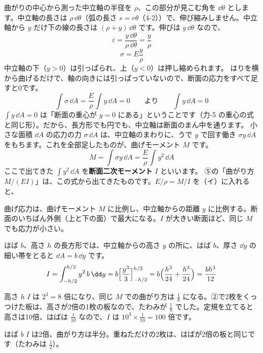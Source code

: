 曲がりの中心から測った中立軸の半径を $\rho$、この部分が見こむ角を $\dd\theta$ とします。中立軸の長さは $\rho\,\dd\theta$（弧の長さ $s=r\theta$（4-2））で、伸び縮みしません。中立軸から $y$ だけ下の線の長さは $(\rho+y)\,\dd\theta$ です。伸びは $y\,\dd\theta$ なので、
\[ \varepsilon=\frac{y\,\dd\theta}{\rho\,\dd\theta}=\frac{y}{\rho} \]
\[ \sigma=E\frac{y}{\rho} \]
中立軸の下（$y>0$）は引っぱられ、上（$y<0$）は押し縮められます。
はりを横から曲げるだけで、軸の向きには引っぱっていないので、断面の応力をすべて足すと0です。
\[ \int\sigma\,\dd A=\frac{E}{\rho}\int y\,\dd A=0\qquad\text{より}\qquad \int y\,\dd A=0 \]
$\displaystyle\int y\,\dd A=0$ は「断面の重心が $y=0$ にある」ということです（力-5 の重心の式と同じ形）。だから、長方形でも円でも、中立軸は断面のまん中を通ります。
小さな面積 $\dd A$ の応力の力 $\sigma\,\dd A$ は、中立軸のまわりに、うで $y$ で回す働き $\sigma y\,\dd A$ をもちます。これを全部足したものが、曲げモーメント $M$ です。
\[ M=\int\sigma y\,\dd A=\frac{E}{\rho}\int y^2\,\dd A \]
ここで出てきた $\displaystyle\int y^2\,\dd A$ を\textbf{断面二次モーメント} $I$ といいます。
⑤の「曲がり方 $M/(EI)$」は、この式から出てきたものです。$E/\rho=M/I$ を（イ）に入れると、
\label{ph:力-10:sigma}
\begin{phyomi}[$\sigma=\dfrac{My}{I}$]
曲げ応力は、曲げモーメント $M$ に比例し、中立軸からの距離 $y$ に比例する。断面のいちばん外側（上と下の面）で最大になる。$I$ が大きい断面ほど、同じ $M$ でも応力が小さい。
\end{phyomi}

はば $b$、高さ $h$ の長方形では、中立軸からの高さ $y$ の所に、はば $b$、厚さ $\dd y$ の細い帯をとると $\dd A=b\,\dd y$ です。
\[ I=\int_{-h/2}^{h/2}y^2\,b\,\dd y=b\Bigl[\frac{y^3}{3}\Bigr]_{-h/2}^{h/2}=b\Bigl(\frac{h^3}{24}+\frac{h^3}{24}\Bigr)=\frac{bh^3}{12} \]
\begin{phbaisuru}{高さ $h$}
$I$ は $2^3=8$ 倍になり、同じ $M$ での曲がり方は $\tfrac{1}{8}$ になる。②で2枚をくっつけた板は、高さが2倍の1枚の板なので、たわみが $\tfrac{1}{8}$ でした。定規を立てると高さは10倍、はばは $\tfrac{1}{10}$ なので、$I$ は $10^3\times\tfrac{1}{10}=100$ 倍です。
\end{phbaisuru}
\begin{phbaisuru}{はば $b$}
$I$ は2倍、曲がり方は半分。重ねただけの2枚は、はばが2倍の板と同じです（たわみは $\tfrac{1}{2}$）。
\end{phbaisuru}

